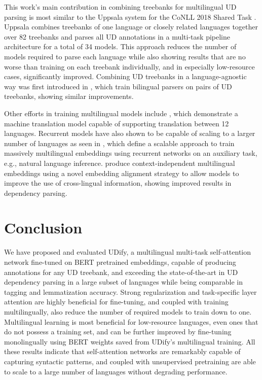 \documentclass[11pt,a4paper]{article}
\begin{document}
This work's main contribution in combining treebanks for multilingual UD parsing is most similar to the Uppsala system for the CoNLL 2018 Shared Task \cite{smith201882}.
Uppsala combines treebanks of one language or closely related languages together over 82 treebanks and parses all UD annotations in a multi-task pipeline architecture for a total of 34 models.
This approach reduces the number of models required to parse each language while also showing results that are no worse than training on each treebank individually, and in especially low-resource cases, significantly improved.
Combining UD treebanks in a language-agnostic way was first introduced in , which train bilingual parsers on pairs of UD treebanks, showing similar improvements.

Other efforts in training multilingual models include , which demonstrate a machine translation model capable of supporting translation between 12 languages.
Recurrent models have also shown to be capable of scaling to a larger number of languages as seen in , which define a scalable approach to train massively multilingual embeddings using recurrent networks on an auxiliary task, e.g., natural language inference.
 produce context-independent multilingual embeddings using a novel embedding alignment strategy to allow models to improve the use of cross-lingual information, showing improved results in dependency parsing.



\section{Conclusion}

We have proposed and evaluated UDify, a multilingual multi-task self-attention network fine-tuned on BERT pretrained embeddings, capable of producing annotations for any UD treebank, and exceeding the state-of-the-art in UD dependency parsing in a large subset of languages while being comparable in tagging and lemmatization accuracy.
Strong regularization and task-specific layer attention are highly beneficial for fine-tuning, and coupled with training multilingually, also reduce the number of required models to train down to one.
Multilingual learning is most beneficial for low-resource languages, even ones that do not possess a training set, and can be further improved by fine-tuning monolingually using BERT weights saved from UDify's multilingual training.
All these results indicate that self-attention networks are remarkably capable of capturing syntactic patterns, and coupled with unsupervised pretraining are able to scale to a large number of languages without degrading performance.
\end{document}
